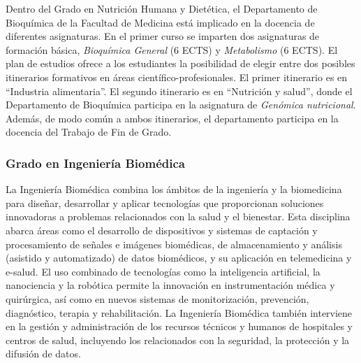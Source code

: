 \documentclass[
  11pt,
  a4paper,
  twoside]{scrreprt}
\begin{document}
Dentro del Grado en Nutrición Humana y Dietética, el Departamento de
Bioquímica de la Facultad de Medicina está implicado en la docencia de
diferentes asignaturas. En el primer curso se imparten dos asignaturas
de formación básica, \emph{Bioquímica General} (6 ECTS) y
\emph{Metabolismo} (6 ECTS). El plan de estudios ofrece a los
estudiantes la posibilidad de elegir entre dos posibles itinerarios
formativos en áreas científico-profesionales. El primer itinerario es en
``Industria alimentaria''. El segundo itinerario es en ``Nutrición y
salud'', donde el Departamento de Bioquímica participa en la asignatura
de \emph{Genómica nutricional}. Además, de modo común a ambos
itinerarios, el departamento participa en la docencia del Trabajo de Fin
de Grado.

\subsubsection{Grado en Ingeniería
Biomédica}\label{grado-en-ingenieruxeda-biomuxe9dica}

La Ingeniería Biomédica combina los ámbitos de la ingeniería y la
biomedicina para diseñar, desarrollar y aplicar tecnologías que
proporcionan soluciones innovadoras a problemas relacionados con la
salud y el bienestar. Esta disciplina abarca áreas como el desarrollo de
dispositivos y sistemas de captación y procesamiento de señales e
imágenes biomédicas, de almacenamiento y análisis (asistido y
automatizado) de datos biomédicos, y su aplicación en telemedicina y
e-salud. El uso combinado de tecnologías como la inteligencia
artificial, la nanociencia y la robótica permite la innovación en
instrumentación médica y quirúrgica, así como en nuevos sistemas de
monitorización, prevención, diagnóstico, terapia y rehabilitación. La
Ingeniería Biomédica también interviene en la gestión y administración
de los recursos técnicos y humanos de hospitales y centros de salud,
incluyendo los relacionados con la seguridad, la protección y la
difusión de datos.
\end{document}
